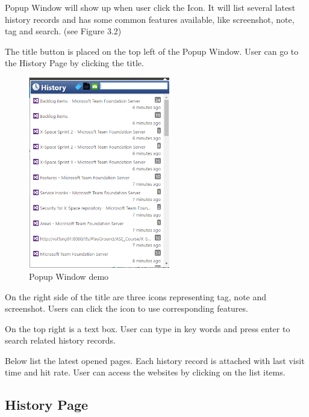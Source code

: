 \documentclass[a5paper]{scrreprt}
\begin{document}
{

Popup Window will show up when user click the Icon. It will list 
several latest history records and has some common features available, like 
screenshot, note, tag and search. (see Figure 3.2)

The title button is placed on the top left of the Popup Window. User can go to the 
History Page by clicking the title.

\begin{figure}
	\centering
	\includegraphics[width=0.55\textwidth]{spec_popup_window}
	\vspace{-22pt}
	\caption{Popup Window demo}
\end{figure}

On the right side of the title are three icons representing tag, note and 
screenshot. Users can click the icon to use corresponding features.

On the top right is a text box. User can type in key words and press enter to 
search related history records.

Below list the latest opened pages. Each history record is attached with last visit 
time and hit rate. User can access the websites by clicking on the list items.

}

\subsection{History Page}
\end{document}
